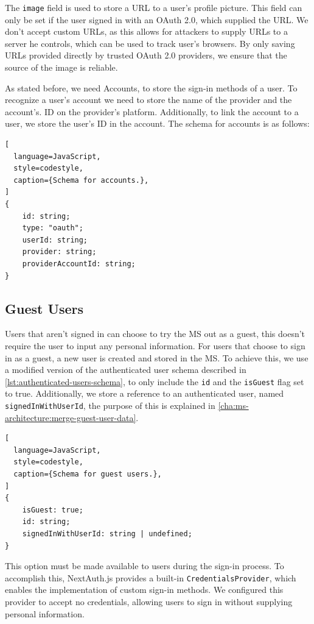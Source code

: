 The \lstinline{image} field is used to store a URL to a user's profile picture. This field
can only be set if the user signed in with an OAuth 2.0, which supplied
the URL.
We don't accept custom URLs, as this allows for attackers to supply URLs to a server he
controls, which can be used to track user's browsers.
By only saving URLs provided directly by trusted OAuth 2.0 providers, we ensure that the
source of the image is reliable.

As stated before, we need Accounts, to store the sign-in methods of a user.
To recognize a user's account we need to store the name of the provider and the account's.
ID on the provider's platform.
Additionally, to link the account to a user, we store the user's ID in the account.
The schema for accounts is as follows:

\begin{lstlisting}[
  language=JavaScript,
  style=codestyle,
  caption={Schema for accounts.},
]
{
    id: string;
    type: "oauth";
    userId: string;
    provider: string;
    providerAccountId: string;
}
\end{lstlisting}

\subsection{Guest Users}

Users that aren't signed in can choose to try the MS out as a guest, this doesn't require
the user to input any personal information.
For users that choose to sign in as a guest, a new user is created and stored in the MS.
To achieve this, we use a modified version of the authenticated user schema described in
\ref{lst:authenticated-users-schema}, to only include the \lstinline{id} and the
\lstinline{isGuest} flag set to true.
Additionally, we store a reference to an authenticated user, named
\lstinline{signedInWithUserId}, the purpose of this is explained in \ref{cha:ms-architecture:merge-guest-user-data}.

\begin{lstlisting}[
  language=JavaScript,
  style=codestyle,
  caption={Schema for guest users.},
]
{
    isGuest: true;
    id: string;
    signedInWithUserId: string | undefined;
} 
\end{lstlisting}

This option must be made available to users during the sign-in process. 
To accomplish this, NextAuth.js provides a built-in \lstinline{CredentialsProvider}, 
which enables the implementation of custom sign-in methods. 
We configured this provider to accept no credentials,
allowing users to sign in without supplying personal information.

